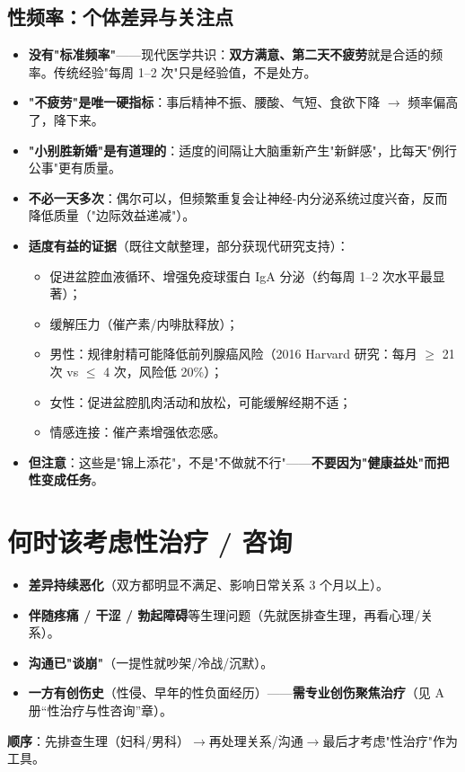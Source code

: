 \documentclass[12pt,UTF8,openany]{ctexbook}
\begin{document}
\subsection*{性频率：个体差异与关注点}

\begin{itemize}[leftmargin=2em,itemsep=0.3em]
  \item \textbf{没有"标准频率"}——现代医学共识：\textbf{双方满意、第二天不疲劳}就是合适的频率。传统经验"每周 1--2 次"只是经验值，不是处方。
  \item \textbf{"不疲劳"是唯一硬指标}：事后精神不振、腰酸、气短、食欲下降 $\to$ 频率偏高了，降下来。
  \item \textbf{"小别胜新婚"是有道理的}：适度的间隔让大脑重新产生"新鲜感"，比每天"例行公事"更有质量。
  \item \textbf{不必一天多次}：偶尔可以，但频繁重复会让神经-内分泌系统过度兴奋，反而降低质量（"边际效益递减"）。
  \item \textbf{适度有益的证据}（既往文献整理，部分获现代研究支持）：
    \begin{itemize}[leftmargin=2em,itemsep=0.2em]
      \item 促进盆腔血液循环、增强免疫球蛋白 IgA 分泌（约每周 1--2 次水平最显著）；
      \item 缓解压力（催产素/内啡肽释放）；
      \item 男性：规律射精可能降低前列腺癌风险（2016 Harvard 研究：每月 $\geq$ 21 次 vs $\leq$ 4 次，风险低 20\%）；
      \item 女性：促进盆腔肌肉活动和放松，可能缓解经期不适；
      \item 情感连接：催产素增强依恋感。
    \end{itemize}
  \item \textbf{但注意}：这些是"锦上添花"，不是"不做就不行"——\textbf{不要因为"健康益处"而把性变成任务}。
\end{itemize}

\section{何时该考虑性治疗 / 咨询}
\begin{itemize}[leftmargin=2em,itemsep=0.3em]
  \item \textbf{差异持续恶化}（双方都明显不满足、影响日常关系 3 个月以上）。
  \item \textbf{伴随疼痛 / 干涩 / 勃起障碍}等生理问题（先就医排查生理，再看心理/关系）。
  \item \textbf{沟通已"谈崩"}（一提性就吵架/冷战/沉默）。
  \item \textbf{一方有创伤史}（性侵、早年的性负面经历）——\textbf{需专业创伤聚焦治疗}（见 A 册“性治疗与性咨询”章）。
\end{itemize}
\textbf{顺序}：先排查生理（妇科/男科）$\to$再处理关系/沟通$\to$最后才考虑"性治疗"作为工具。
\end{document}
